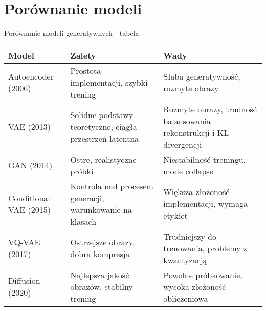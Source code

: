 \documentclass{beamer}
\begin{document}

\section{Porównanie modeli}

\begin{frame}{Porównanie modeli generatywnych - tabela}
  \begin{tabular}{|p{2.5cm}|p{3.5cm}|p{3.5cm}|}
    \hline
    \textbf{Model} & \textbf{Zalety} & \textbf{Wady} \\
    \hline
    Autoencoder (2006) & Prostota implementacji, szybki trening & Słaba generatywność, rozmyte obrazy \\
    \hline
    VAE (2013) & Solidne podstawy teoretyczne, ciągła przestrzeń latentna & Rozmyte obrazy, trudność balansowania rekonstrukcji i KL divergencji \\
    \hline
    GAN (2014) & Ostre, realistyczne próbki & Niestabilność treningu, mode collapse \\
    \hline
    Conditional VAE (2015) & Kontrola nad procesem generacji, warunkowanie na klasach & Większa złożoność implementacji, wymaga etykiet \\
    \hline
    VQ-VAE (2017) & Ostrzejsze obrazy, dobra kompresja & Trudniejszy do trenowania, problemy z kwantyzacją \\
    \hline
    Diffusion (2020) & Najlepsza jakość obrazów, stabilny trening & Powolne próbkowanie, wysoka złożoność obliczeniowa \\
    \hline
  \end{tabular}
\end{frame}
\end{document}
